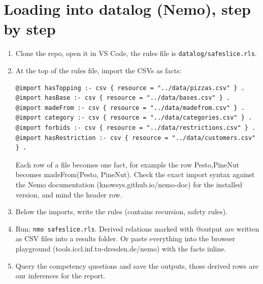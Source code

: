 \documentclass[11pt,a4paper]{article}
\begin{document}
\section{Loading into datalog (Nemo), step by step}
\begin{enumerate}[leftmargin=*, itemsep=2pt]
\item Clone the repo, open it in VS Code, the rules file is \texttt{datalog/safeslice.rls}.
\item At the top of the rules file, import the CSVs as facts:
\begin{verbatim}
@import hasTopping :- csv { resource = "../data/pizzas.csv" } .
@import hasBase :- csv { resource = "../data/bases.csv" } .
@import madeFrom :- csv { resource = "../data/madefrom.csv" } .
@import category :- csv { resource = "../data/categories.csv" } .
@import forbids :- csv { resource = "../data/restrictions.csv" } .
@import hasRestriction :- csv { resource = "../data/customers.csv" } .
\end{verbatim}
Each row of a file becomes one fact, for example the row Pesto,PineNut becomes madeFrom(Pesto, PineNut). Check the exact import syntax against the Nemo documentation (knowsys.github.io/nemo-doc) for the installed version, and mind the header row.
\item Below the imports, write the rules (contains recursion, safety rules).
\item Run: \texttt{nmo safeslice.rls}. Derived relations marked with @output are written as CSV files into a results folder. Or paste everything into the browser playground (tools.iccl.inf.tu-dresden.de/nemo) with the facts inline.
\item Query the competency questions and save the outputs, those derived rows are our inferences for the report.
\end{enumerate}
\end{document}
